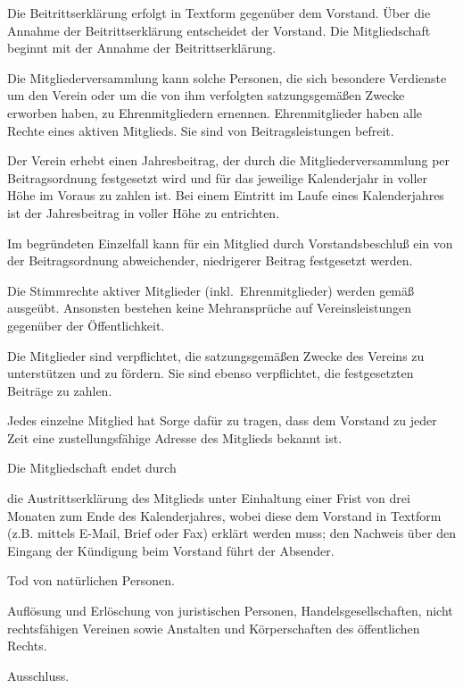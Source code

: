 \documentclass[draft]{scrartcl}
\begin{document}
\begin{contract}
Die Beitrittserklärung erfolgt in Textform gegenüber dem Vorstand. Über die
Annahme der Beitrittserklärung entscheidet der Vorstand. Die Mitgliedschaft
beginnt mit der Annahme der Beitrittserklärung.

Die Mitgliederversammlung kann solche Personen, die sich besondere Verdienste
um den Verein oder um die von ihm verfolgten satzungsgemäßen Zwecke erworben
haben, zu Ehrenmitgliedern ernennen. Ehrenmitglieder haben alle Rechte eines
aktiven Mitglieds. Sie sind von Beitragsleistungen befreit.


Der Verein erhebt einen Jahresbeitrag, der durch die Mitgliederversammlung
per Beitragsordnung festgesetzt wird und für das jeweilige Kalenderjahr in
voller Höhe im Voraus zu zahlen ist. Bei einem Eintritt im Laufe eines
Kalenderjahres ist der Jahresbeitrag in voller Höhe zu entrichten.

Im begründeten Einzelfall kann für ein Mitglied durch Vorstandsbeschluß ein
von der Beitragsordnung abweichender, niedrigerer Beitrag festgesetzt werden.


Die Stimmrechte aktiver Mitglieder (inkl.\ Ehrenmitglieder) werden gemäß
~ ausgeübt. Ansonsten bestehen
keine Mehransprüche auf Vereinsleistungen gegenüber der Öffentlichkeit.

Die Mitglieder sind verpflichtet, die satzungsgemäßen Zwecke des Vereins zu
unterstützen und zu fördern. Sie sind ebenso verpflichtet, die festgesetzten
Beiträge zu zahlen.

Jedes einzelne Mitglied hat Sorge dafür zu tragen, dass dem Vorstand zu jeder
Zeit eine zustellungsfähige Adresse des Mitglieds bekannt ist.


Die Mitgliedschaft endet durch

\begin{compactitem}
  \item die Austrittserklärung des Mitglieds unter Einhaltung einer Frist von
  drei Monaten zum Ende des Kalenderjahres, wobei diese dem Vorstand in Textform
  (z.B. mittels E-Mail, Brief oder Fax) erklärt werden muss; den Nachweis über
  den Eingang der Kündigung beim Vorstand führt der Absender.
  \item Tod von natürlichen Personen.
  \item Auf\/lösung und Erlöschung von juristischen Personen, Handelsgesellschaften,
  nicht rechtsfähigen Vereinen sowie Anstalten und Körperschaften des öffentlichen
  Rechts.
  \item Ausschluss.
\end{compactitem}


\end{contract}
\end{document}
